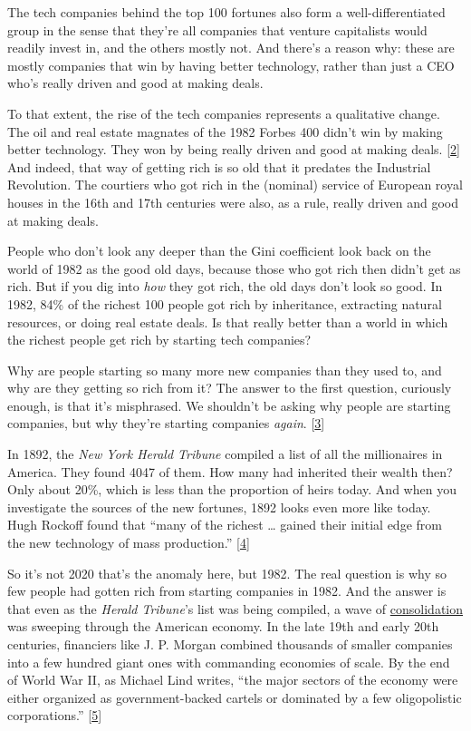 The tech companies behind the top 100 fortunes also form a
well-differentiated group in the sense that they're all companies that
venture capitalists would readily invest in, and the others mostly not.
And there's a reason why: these are mostly companies that win by having
better technology, rather than just a CEO who's really driven and good
at making deals.

To that extent, the rise of the tech companies represents a qualitative
change. The oil and real estate magnates of the 1982 Forbes 400 didn't
win by making better technology. They won by being really driven and
good at making deals. {[}\hyperref[f2n]{2}{]} And indeed, that way of
getting rich is so old that it predates the Industrial Revolution. The
courtiers who got rich in the (nominal) service of European royal houses
in the 16th and 17th centuries were also, as a rule, really driven and
good at making deals.

People who don't look any deeper than the Gini coefficient look back on
the world of 1982 as the good old days, because those who got rich then
didn't get as rich. But if you dig into \emph{how} they got rich, the
old days don't look so good. In 1982, 84\% of the richest 100 people got
rich by inheritance, extracting natural resources, or doing real estate
deals. Is that really better than a world in which the richest people
get rich by starting tech companies?

Why are people starting so many more new companies than they used to,
and why are they getting so rich from it? The answer to the first
question, curiously enough, is that it's misphrased. We shouldn't be
asking why people are starting companies, but why they're starting
companies \emph{again}. {[}\hyperref[f3n]{3}{]}

In 1892, the \emph{New York Herald Tribune} compiled a list of all the
millionaires in America. They found 4047 of them. How many had inherited
their wealth then? Only about 20\%, which is less than the proportion of
heirs today. And when you investigate the sources of the new fortunes,
1892 looks even more like today. Hugh Rockoff found that ``many of the
richest \ldots{} gained their initial edge from the new technology of
mass production.'' {[}\hyperref[f4n]{4}{]}

So it's not 2020 that's the anomaly here, but 1982. The real question is
why so few people had gotten rich from starting companies in 1982. And
the answer is that even as the \emph{Herald Tribune}'s list was being
compiled, a wave of \href{re.html}{consolidation} was sweeping through
the American economy. In the late 19th and early 20th centuries,
financiers like J. P. Morgan combined thousands of smaller companies
into a few hundred giant ones with commanding economies of scale. By the
end of World War II, as Michael Lind writes, ``the major sectors of the
economy were either organized as government-backed cartels or dominated
by a few oligopolistic corporations.'' {[}\hyperref[f5n]{5}{]}


